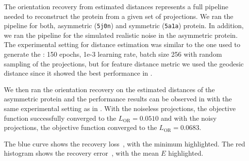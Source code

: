 The orientation recovery from estimated distances represents a full pipeline needed to reconstruct the protein from a given set of projections.
We ran the pipeline for both, asymmetric (\texttt{5j0n}) and symmetric (\texttt{5a1a}) protein.
In addition, we ran the pipeline for the simulated realistic noise in the asymmetric protein.
The experimental setting for distance estimation was similar to the one used to generate the : 150 epochs, 1e-3 learning rate, batch size 256 with random sampling of the projections, but for feature distance metric we used the geodesic distance since it showed the best performance in .

We then ran the orientation recovery on the estimated distances of the asymmetric protein and the performance results can be observed in  with the same experimental setting as in .
With the noiseless projections, the objective function successfully converged to the $L_\text{OR} = 0.0510$ and with the noisy projections, the objective function converged to the $L_\text{OR} = 0.0683$.

The blue curve shows the recovery loss~, with the minimum highlighted.
The red histogram shows the recovery error~, with the mean $E$ highlighted.

